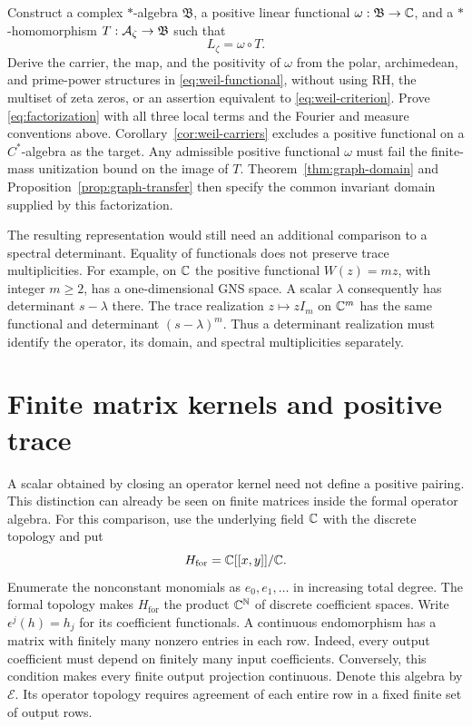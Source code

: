 \begin{openproblem}
Construct a complex $*$-algebra $\mathfrak B$, a positive linear
functional $\omega:\mathfrak B\to\mathbb C$, and a $*$-homomorphism
$T:\mathcal A_\zeta\to\mathfrak B$ such that
\begin{equation}
 L_\zeta=\omega\circ T.
 \label{eq:factorization}
\end{equation}
Derive the carrier, the map, and the positivity of $\omega$ from the
polar, archimedean, and prime-power structures in
\eqref{eq:weil-functional}, without using RH, the multiset of zeta zeros,
or an assertion equivalent to \eqref{eq:weil-criterion}.  Prove
\eqref{eq:factorization} with all three local terms and the Fourier and
measure conventions above.  Corollary~\ref{cor:weil-carriers} excludes
a positive functional on a $C^*$-algebra as the target.
Any admissible positive functional $\omega$ must fail the finite-mass
unitization bound on the image of $T$.
Theorem~\ref{thm:graph-domain} and
Proposition~\ref{prop:graph-transfer} then specify the common invariant
domain supplied by this factorization.
\end{openproblem}

The resulting representation would still need an additional comparison
to a spectral determinant.  Equality of functionals does not preserve
trace multiplicities.  For example, on $\mathbb C$ the positive functional
$W(z)=mz$, with integer $m\geq2$, has a one-dimensional GNS space.
A scalar $\lambda$ consequently has determinant $s-\lambda$ there.
The trace realization $z\mapsto zI_m$ on $\mathbb C^m$ has the same functional
and determinant $(s-\lambda)^m$.  Thus a determinant realization must
identify the operator, its domain, and spectral multiplicities separately.


\section{Finite matrix kernels and positive trace}
\label{sec:weil-formal-kernels}

A scalar obtained by closing an operator kernel need not define a
positive pairing.  This distinction can already be seen on finite
matrices inside the formal operator algebra.
For this comparison, use the underlying field $\mathbb C$ with the discrete
topology and put
\[
 H_{\mathrm{for}}=\mathbb C[[x,y]]/\mathbb C.
\]
Enumerate the nonconstant monomials as $e_0,e_1,\ldots$ in increasing
total degree.  The formal topology makes $H_{\mathrm{for}}$ the product
$\mathbb C^{\mathbb N}$ of discrete coefficient spaces.  Write
$\epsilon^j(h)=h_j$ for its coefficient functionals.
A continuous endomorphism has a matrix with finitely many nonzero entries
in each row.  Indeed, every output coefficient must depend on finitely
many input coefficients.  Conversely, this condition makes every finite
output projection continuous.  Denote this algebra by $\mathscr E$.
Its operator topology requires agreement of each entire row in a fixed
finite set of output rows.

